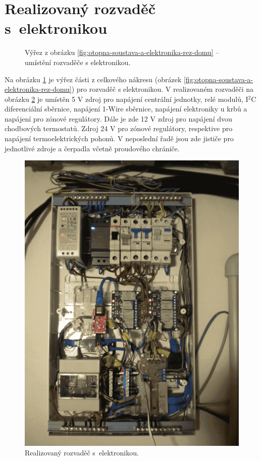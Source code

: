\section{Realizovaný rozvaděč s~elektronikou}
\begin{figure}[H]
   \centering
   \def\svgwidth{0.5\columnwidth}
   
    \caption[Výřez pro umístění rozvaděče s elektronikou.]{Výřez z obrázku \ref{fig:otopna-soustava-a-elektronika-rez-domu} – umístění rozvaděče s elektronikou.}
    \label{fig:vyrez-rozvadec}
\end{figure}

Na obrázku \ref{fig:vyrez-rozvadec} je výřez části z celkového nákresu (obrázek \ref{fig:otopna-soustava-a-elektronika-rez-domu}) pro rozvaděč s elektronikou. V realizovaném rozvaděči na obrázku \ref{fig:rozvadec-ve-sklepe-s-elektronikou} je umístěn 5 V zdroj pro napájení centrální jednotky, relé modulů, I$^2$C diferenciální sběrnice, napájení 1-Wire sběrnice, napájení elektroniky u krbů a napájení pro zónové regulátory. Dále je zde 12 V zdroj pro napájení dvou chodbových termostatů. Zdroj 24 V pro zónové regulátory, respektive pro napájení termoelektrických pohonů. V  neposlední řadě jsou zde jističe pro jednotlivé zdroje a čerpadla včetně proudového chrániče.

\begin{figure}[H]
    \centering
    \includegraphics[width=\textwidth]{images/rozvadec-ve-sklepe-s-elektronikou.png}
    \caption{Realizovaný rozvaděč s~elektronikou.}
    \label{fig:rozvadec-ve-sklepe-s-elektronikou}
\end{figure}